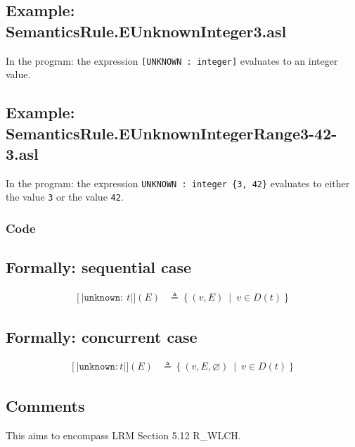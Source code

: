 \documentclass{book}
\newcommand\syntt[1]{\mathtt{#1}}
\newcommand\llbracket{[|}
\newcommand\rrbracket{|]}
\newcommand\interp[1]{\left\llbracket #1 \right\rrbracket}
\newcommand\st[0]{\ \middle|\ }
\begin{document}
  \subsection{Example: SemanticsRule.EUnknownInteger3.asl}
    In the program:
    the expression \texttt{[UNKNOWN : integer]} evaluates to an integer value.

  \subsection{Example: SemanticsRule.EUnknownIntegerRange3-42-3.asl}

    In the program:
    the expression \texttt{UNKNOWN : integer \{3, 42\}} evaluates to either the value
\texttt{3} or the value \texttt{42}.

  \subsubsection{Code}

  \subsection{Formally: sequential case}

  \begin{align}  
  \interp{\syntt{unknown:}\ t} (E) & \triangleq \left\{ (v, E) \st{} v \in{} D(t) \right\}
  \label{eq:sem-seq-unknown}  
  \end{align}  

  \subsection{Formally: concurrent case}

  \begin{align}
  \interp{\syntt{unknown:} t} (E) & \triangleq \left\{ (v, E, \varnothing) \st{} v \in{} D(t) \right\}
  \label{eq:sem-conc-unknown}
  \end{align}

  \subsection{Comments}
  This aims to encompass LRM Section 5.12 R\_WLCH.
\end{document}
